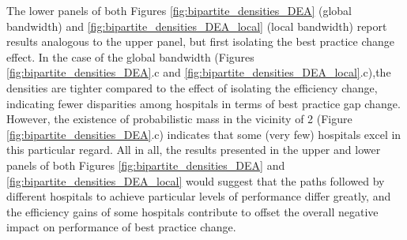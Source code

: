 \documentclass[11pt,a4paper,oneside]{article}
\begin{document}










The lower panels of both Figures \ref{fig:bipartite_densities_DEA} (global bandwidth) and \ref{fig:bipartite_densities_DEA_local} (local bandwidth) report results analogous to the upper panel, but first isolating the best practice change effect. In the case of the global bandwidth (Figures \ref{fig:bipartite_densities_DEA}.c and \ref{fig:bipartite_densities_DEA_local}.c),the densities are tighter compared to the effect of isolating the efficiency change, indicating fewer disparities among hospitals in terms of best practice gap change. However, the existence of probabilistic mass in the vicinity of 2 (Figure \ref{fig:bipartite_densities_DEA}.c) indicates that some (very few) hospitals excel in this particular regard. All in all, the results presented in the upper and lower panels of both Figures \ref{fig:bipartite_densities_DEA} and \ref{fig:bipartite_densities_DEA_local} would suggest that the paths followed by different hospitals to achieve particular levels of performance differ greatly, and the efficiency gains of some hospitals contribute to offset the overall negative impact on performance of best practice change. 
\end{document}
